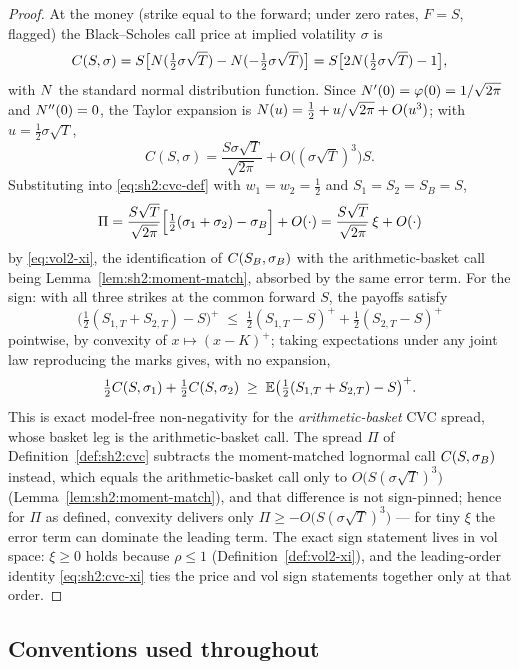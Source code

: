 \begin{proof}
At the money (strike equal to the forward; under zero rates, $F = S$,
flagged) the Black--Scholes call price at implied volatility $\sigma$ is
\[
  C(S, \sigma)
  = S\bigl[N(\tfrac12 \sigma \sqrt{T}) - N(-\tfrac12 \sigma \sqrt{T})\bigr]
  = S\bigl[2 N(\tfrac12 \sigma \sqrt{T}) - 1\bigr],
\]
with $N$ the standard normal distribution function. Since
$N'(0) = \varphi(0) = 1/\sqrt{2\pi}$ and $N''(0) = 0$, the Taylor
expansion is $N(u) = \tfrac12 + u/\sqrt{2\pi} + O(u^3)$; with
$u = \tfrac12 \sigma \sqrt{T}$,
\[
  C(S, \sigma) = \frac{S \sigma \sqrt{T}}{\sqrt{2\pi}}
                 + O\bigl((\sigma\sqrt{T})^3\bigr) S.
\]
Substituting into \eqref{eq:sh2:cvc-def} with $w_1 = w_2 = \tfrac12$ and
$S_1 = S_2 = S_B = S$,
\[
  \Pi = \frac{S \sqrt{T}}{\sqrt{2\pi}}
        \Bigl[\tfrac12(\sigma_1 + \sigma_2) - \sigma_B\Bigr] + O(\cdot)
      = \frac{S \sqrt{T}}{\sqrt{2\pi}}\, \xi + O(\cdot)
\]
by \eqref{eq:vol2-xi}, the identification of $C(S_B, \sigma_B)$ with the
arithmetic-basket call being Lemma~\ref{lem:sh2:moment-match}, absorbed by
the same error term. For the sign: with all three strikes at the common
forward $S$, the payoffs satisfy
\[
  \bigl(\tfrac12(S_{1,T} + S_{2,T}) - S\bigr)^+
  \;\le\; \tfrac12 (S_{1,T} - S)^+ + \tfrac12 (S_{2,T} - S)^+
\]
pointwise, by convexity of $x \mapsto (x - K)^+$; taking expectations under
any joint law reproducing the marks gives, with no expansion,
\[
  \tfrac12 C(S, \sigma_1) + \tfrac12 C(S, \sigma_2)
  \;\ge\; \mathbb{E}\bigl(\tfrac12(S_{1,T} + S_{2,T}) - S\bigr)^+ .
\]
This is exact model-free non-negativity for the \emph{arithmetic-basket}
CVC spread, whose basket leg is the arithmetic-basket call. The spread
$\Pi$ of Definition~\ref{def:sh2:cvc} subtracts the moment-matched
lognormal call $C(S, \sigma_B)$ instead, which equals the arithmetic-basket
call only to $O\bigl(S(\sigma\sqrt{T})^3\bigr)$
(Lemma~\ref{lem:sh2:moment-match}), and that difference is not
sign-pinned; hence for $\Pi$ as defined, convexity delivers only
$\Pi \ge -O\bigl(S(\sigma\sqrt{T})^3\bigr)$ --- for tiny $\xi$ the error
term can dominate the leading term. The exact sign statement lives in vol
space: $\xi \ge 0$ holds because $\rho \le 1$
(Definition~\ref{def:vol2-xi}), and the leading-order identity
\eqref{eq:sh2:cvc-xi} ties the price and vol sign statements together
only at that order.
\end{proof}

\subsection{Conventions used throughout}\label{sec:sh2:conventions}

